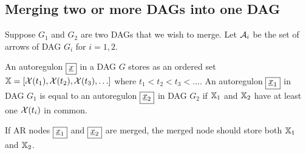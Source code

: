 \documentclass[12pt]{article}
\begin{document}
\subsection{Merging two or more DAGs into one DAG}
Suppose $G_1$ and $G_2$
are two DAGs that we wish to merge.
Let ${\cal A}_i$ be the set of arrows of DAG $G_i$
for $i=1,2$.

An autoregulon $\boxed{\rvx}$
in a DAG $G$
stores as  an ordered set\\
${ \mathbb{X}} = [{\cal X}(t_1), {\cal X}(t_2),
{\cal X}(t_3),  \ldots]$ where
 $t_1<t_2 < t_3 <\ldots$.
An autoregulon $\boxed{\rvx_1}$ in DAG $G_1$
is equal to an autoregulon $\boxed{\rvx_2}$ in DAG $G_2$
if ${ \mathbb{X}}_1$ and ${ \mathbb{X}}_2$ have at least one
${\cal X}(t_i)$ in common.

If AR nodes $\boxed{\rvx_1}$
and $\boxed{\rvx_2}$ are merged,
the merged node should store
both ${ \mathbb{X}}_1$ and ${ \mathbb{X}}_2$.
\end{document}
